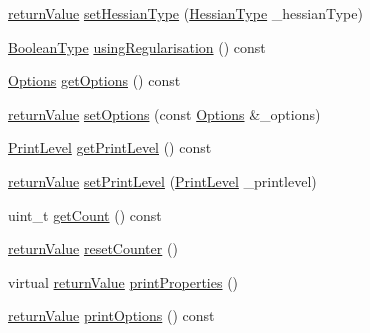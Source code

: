 \begin{DoxyCompactItemize}
\item 
\hyperlink{_message_handling_8hpp_a81d556f613bfbabd0b1f9488c0fa865e}{return\+Value} \hyperlink{class_q_problem_b_a8ad9f3322852e355ac2dc4e549e495e9}{set\+Hessian\+Type} (\hyperlink{_types_8hpp_a604cad5cda14e378ce4a77ab28ee9fd9}{Hessian\+Type} \+\_\+hessian\+Type)
\item 
\hyperlink{_types_8hpp_a20f82124c82b6f5686a7fce454ef9089}{Boolean\+Type} \hyperlink{class_q_problem_b_abaf8197d399cfd636513ae65225c0068}{using\+Regularisation} () const
\item 
\hyperlink{class_options}{Options} \hyperlink{class_q_problem_b_aa8f201dd83574ca6d9c8aa7a7b6a8f4f}{get\+Options} () const
\item 
\hyperlink{_message_handling_8hpp_a81d556f613bfbabd0b1f9488c0fa865e}{return\+Value} \hyperlink{class_q_problem_b_a5401e252d34757797ce3e913644e8b2c}{set\+Options} (const \hyperlink{class_options}{Options} \&\+\_\+options)
\item 
\hyperlink{_types_8hpp_a83ff212f474e3669d8fac2d727f65de5}{Print\+Level} \hyperlink{class_q_problem_b_abe79cfdbf6cec0560d08bc0eaab05210}{get\+Print\+Level} () const
\item 
\hyperlink{_message_handling_8hpp_a81d556f613bfbabd0b1f9488c0fa865e}{return\+Value} \hyperlink{class_q_problem_b_a2be2208a1befa1f7fa03f3c11d91ae7b}{set\+Print\+Level} (\hyperlink{_types_8hpp_a83ff212f474e3669d8fac2d727f65de5}{Print\+Level} \+\_\+printlevel)
\item 
uint\+\_\+t \hyperlink{class_q_problem_b_a21b332ce4d997b428c2ecec606652777}{get\+Count} () const
\item 
\hyperlink{_message_handling_8hpp_a81d556f613bfbabd0b1f9488c0fa865e}{return\+Value} \hyperlink{class_q_problem_b_a29492d7ab426c13e0f6fa3b09de2476e}{reset\+Counter} ()
\item 
virtual \hyperlink{_message_handling_8hpp_a81d556f613bfbabd0b1f9488c0fa865e}{return\+Value} \hyperlink{class_q_problem_b_a587077ee58951d181f89674fd9c15f7b}{print\+Properties} ()
\item 
\hyperlink{_message_handling_8hpp_a81d556f613bfbabd0b1f9488c0fa865e}{return\+Value} \hyperlink{class_q_problem_b_ab529435b82c728105652321a0a2d054a}{print\+Options} () const
\end{DoxyCompactItemize}

